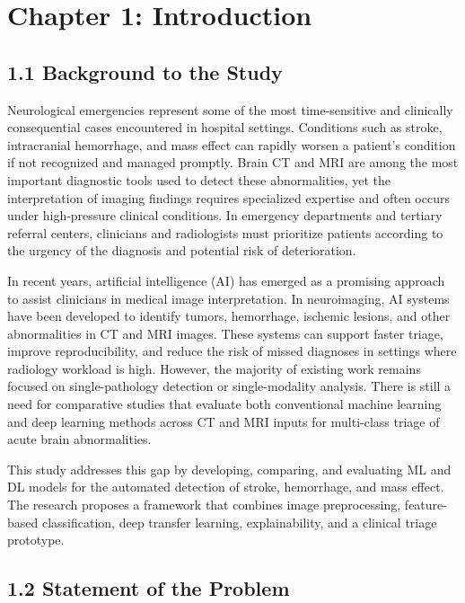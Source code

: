 \documentclass[12pt,a4paper]{report}
\begin{document}
\chapter{Chapter 1: Introduction}

\section{1.1 Background to the Study}

Neurological emergencies represent some of the most time-sensitive and clinically consequential cases encountered in hospital settings. Conditions such as stroke, intracranial hemorrhage, and mass effect can rapidly worsen a patient’s condition if not recognized and managed promptly. Brain CT and MRI are among the most important diagnostic tools used to detect these abnormalities, yet the interpretation of imaging findings requires specialized expertise and often occurs under high-pressure clinical conditions. In emergency departments and tertiary referral centers, clinicians and radiologists must prioritize patients according to the urgency of the diagnosis and potential risk of deterioration.

In recent years, artificial intelligence (AI) has emerged as a promising approach to assist clinicians in medical image interpretation. In neuroimaging, AI systems have been developed to identify tumors, hemorrhage, ischemic lesions, and other abnormalities in CT and MRI images. These systems can support faster triage, improve reproducibility, and reduce the risk of missed diagnoses in settings where radiology workload is high. However, the majority of existing work remains focused on single-pathology detection or single-modality analysis. There is still a need for comparative studies that evaluate both conventional machine learning and deep learning methods across CT and MRI inputs for multi-class triage of acute brain abnormalities.

This study addresses this gap by developing, comparing, and evaluating ML and DL models for the automated detection of stroke, hemorrhage, and mass effect. The research proposes a framework that combines image preprocessing, feature-based classification, deep transfer learning, explainability, and a clinical triage prototype.

\section{1.2 Statement of the Problem}
\end{document}
